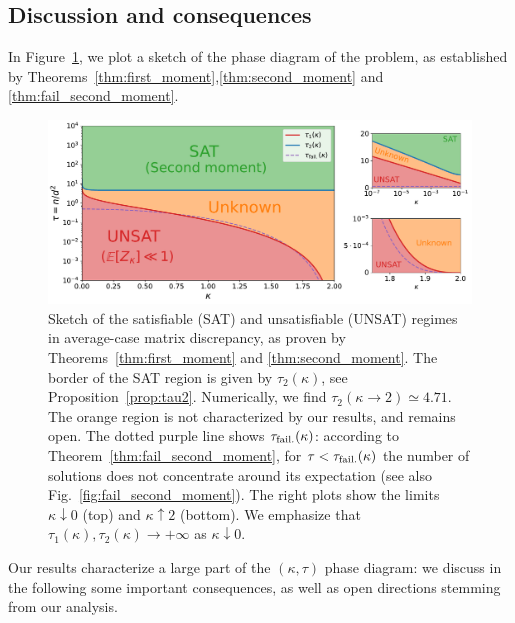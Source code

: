 \subsection{Discussion and consequences}\label{subsec:discussion}

In Figure~\ref{fig:phase_diagram}, we plot a sketch of the phase diagram of the problem, as established by Theorems~\ref{thm:first_moment},\ref{thm:second_moment} and \ref{thm:fail_second_moment}. 
\begin{figure}[!t]
    \centering
    \includegraphics[width=1.0\textwidth]{figures/phase_diagram.pdf}
    \caption{
        Sketch of the satisfiable (SAT) and unsatisfiable (UNSAT) regimes in average-case matrix discrepancy, 
        as proven by Theorems~\ref{thm:first_moment} and \ref{thm:second_moment}. 
        The border of the SAT region is given by $\tau_2(\kappa)$, see Proposition~\ref{prop:tau2}. 
        Numerically, we find $\tau_2(\kappa \to 2) \simeq 4.71$.
        The orange region is not characterized by our results, and remains open.
        The dotted purple line shows $\tau_{\rm fail.}(\kappa)$: according to Theorem~\ref{thm:fail_second_moment}, for $\tau < \tau_{\rm fail.}(\kappa)$ the number of solutions 
        does not concentrate around its expectation (see also Fig.~\ref{fig:fail_second_moment}).
        The right plots show the limits $\kappa \downarrow 0$ (top) and $\kappa \uparrow 2$ (bottom).
        We emphasize that $\tau_1(\kappa), \tau_2(\kappa) \to +\infty$ as $\kappa \downarrow 0$.
    \label{fig:phase_diagram}}
\end{figure}
Our results characterize a large part of the $(\kappa, \tau)$ phase diagram: 
we discuss in the following some important consequences, as well as open directions stemming from our analysis.

